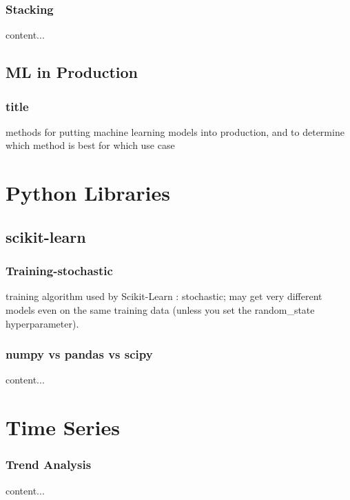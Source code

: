 \documentclass{beamer}
\begin{document}
\begin{frame}\frametitle{Stacking}
	content...
\end{frame}







\subsection{ML in Production}
\begin{frame}\frametitle{title}
	methods for putting machine learning models into production, and to determine which method is best for which use case\\
\end{frame}


\section{Python Libraries}
\subsection{scikit-learn}

\begin{frame}\frametitle{Training-stochastic}
training algorithm used by Scikit-Learn : stochastic; may
get very different models even on the same training data (unless you set the random\_state hyperparameter).
\end{frame}

\begin{frame}\frametitle{numpy vs pandas vs scipy}
	content...
\end{frame}



\section{Time Series}
\begin{frame}\frametitle{Trend Analysis}
	content...
\end{frame}	
\end{document}
